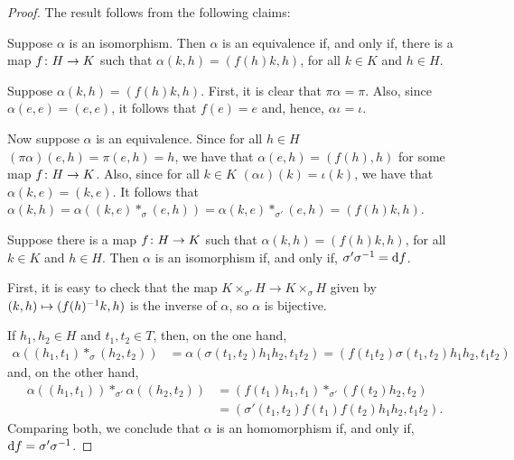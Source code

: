 \begin{proof}
    The result follows from the following claims:
    \newclaims
    \begin{claim}
        Suppose $\alpha$ is an isomorphism. 
        Then $\alpha$ is an equivalence if, and only if, there is a map $f\colon H \to K$ such that $\alpha(k,h) = (f(h)k, h)$, for all $k\in K$ and $h\in H$.
    \end{claim}
    
    Suppose $\alpha(k,h) = (f(h)k, h)$. 
    First, it is clear that $\pi \alpha = \pi$.
    Also, since $\alpha(e,e) = (e,e)$, it follows that $f(e) = e$ and, hence, $\alpha \iota = \iota$. 
    
    Now suppose $\alpha$ is an equivalence. 
    Since for all $h\in H$ $(\pi \alpha) (e, h) = \pi (e, h) = h$, we have that $\alpha (e, h) = (f(h), h)$ for some map $f\colon H\to K$. 
    Also, since for all $k\in K$ $(\alpha \iota) (k) = \iota(k)$, we have that $\alpha(k, e) = (k,e)$. 
    It follows that $\alpha (k,h) = \alpha((k,e) *_\sigma (e, h)) = \alpha(k, e) *_{\sigma'} (e, h) = (f(h)k, h)$. 
    
    \begin{claim}
        Suppose there is a map $f\colon H \to K$ such that $\alpha(k,h) = (f(h)k, h)$, for all $k\in K$ and $h\in H$. 
        Then $\alpha$ is an isomorphism if, and only if, $\sigma'\sigma^{-1} = \mathrm{d}f$.
    \end{claim}
 
    First, it is easy to check that the map $K \times_{\sigma'} H \to K \times_{\sigma} H$ given by $(k,h)\mapsto (f(h)^{-1} k, h)$ is the inverse of $\alpha$, so $\alpha$ is bijective.
    
    If $h_1, h_2 \in H$ and $t_1, t_2 \in T$, then, on the one hand,
    \begin{align*}
        \alpha ((h_1, t_1)*_{\sigma}(h_2, t_2) ) &= \alpha (\sigma(t_1, t_2) h_1 h_2, t_1 t_2) = 
        ( f(t_1 t_2)\sigma(t_1, t_2) h_1 h_2, t_1 t_2)
    \end{align*}
    and, on the other hand,
    \begin{align*}
        \alpha ((h_1, t_1)) *_{\sigma'} \alpha ((h_2, t_2) ) &= ( f(t_1) h_1, t_1) *_{\sigma'} ( f(t_2) h_2, t_2) \\&= 
        (\sigma'(t_1, t_2) f(t_1) f(t_2) h_1 h_2, t_1 t_2).
    \end{align*}
    Comparing both, we conclude that $\alpha$ is an homomorphism if, and only if, $\mathrm{d}f = \sigma' \sigma^{-1}$.
\end{proof}

